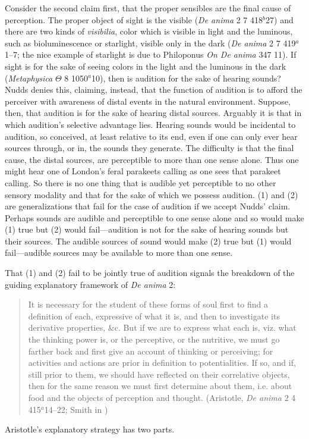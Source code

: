 Consider the second claim first, that the proper sensibles are the final cause of perception. The proper object of sight is the visible (\emph{De anima} 2 7 418\( ^{b} \)27) and there are two kinds of \emph{visibilia}, color which is visible in light and the luminous, such as bioluminescence or starlight, visible only in the dark (\emph{De anima} 2 7 419\( ^{a} \)1--7; the nice example of starlight is due to Philoponus  \emph{On \emph{De anima}} 347 11). If sight is for the sake of seeing colors in the light and the luminous in the dark (\emph{Metaphysica} \( \Theta \) 8 1050\( ^{a} \)10), then is audition for the sake of hearing sounds? Nudds denies this, claiming, instead, that the function of audition is to afford the perceiver with awareness of distal events in the natural environment. Suppose, then, that audition is for the sake of hearing distal sources. Arguably it is that in which audition's selective advantage lies. Hearing sounds would be incidental to audition, so conceived, at least relative to its end, even if one can only ever hear sources through, or in, the sounds they generate. The difficulty is that the final cause, the distal sources, are perceptible to more than one sense alone. Thus one might hear one of London's feral parakeets calling as one sees that parakeet calling. So there is no one thing that is audible yet perceptible to no other sensory modality and that for the sake of which we possess audition. (1) and (2) are generalizations that fail for the case of audition if we accept Nudds' claim. Perhaps sounds are audible and perceptible to one sense alone and so would make (1) true but (2) would fail---audition is not for the sake of hearing sounds but their sources. The audible sources of sound would make (2) true but (1) would fail---audible sources may be available to more than one sense.

That (1) and (2) fail to be jointly true of audition signals the breakdown of the guiding explanatory framework of \emph{De anima} 2:
\begin{quote}
	It is necessary for the student of these forms of soul first to find a definition of each, expressive of what it is, and then to investigate its derivative properties, \&c. But if we are to express what each is, viz. what the thinking power is, or the perceptive, or the nutritive, we must go farther back and first give an account of thinking or perceiving; for activities and actions are prior in definition to potentialities. If so, and if, still prior to them, we should have reflected on their correlative objects, then for the same reason we must first determine about them, i.e. about food and the objects of perception and thought. (Aristotle, \emph{De anima} 2 4 415\( ^{a} \)14--22; Smith in \citealt[26]{Barnes:1984uq})
\end{quote}
Aristotle's explanatory strategy has two parts. 

